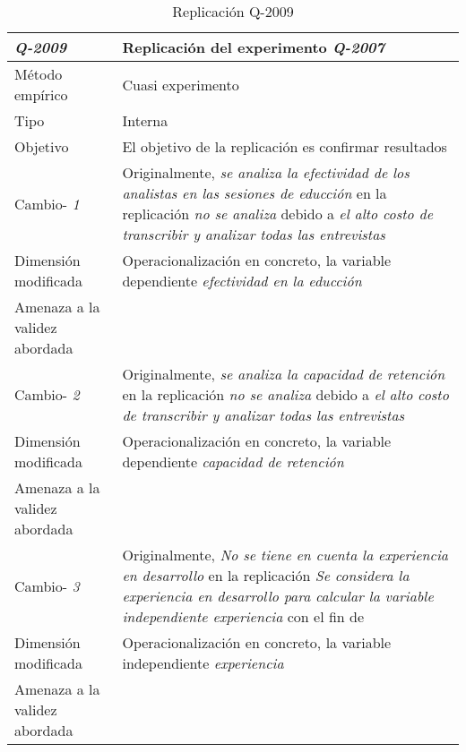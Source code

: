 
\begin{table}
\caption{Replicación Q-2009}
\begin{tabular}{| p{3.3cm} | p{9cm} |}
\hline

\textbf {\textit{Q-2009}} & Replicación del experimento \textit{Q-2007 }    \\  \hline

Método empírico &  Cuasi experimento   \\  \hline
Tipo &  Interna   \\  \hline
Objetivo  &   El objetivo de la replicación es confirmar resultados   \\  \hline \hline

Cambio- \textit{1}   & \parbox[t]{9cm} {Originalmente,  \textit{se analiza la efectividad de los analistas en las sesiones de educción} } \parbox[t]{9cm}{en la replicación \textit{no se analiza} }  debido a  \textit{el alto costo de transcribir y analizar todas las entrevistas } \\  \hline
Dimensión modificada & 
 Operacionalización  en concreto, la variable  dependiente \textit { efectividad en la educción }  \\  \hline 
Amenaza a la validez abordada  &     \\  \hline
 \hline
Cambio- \textit{2}   & \parbox[t]{9cm} {Originalmente,  \textit{se analiza la capacidad de retención
} } \parbox[t]{9cm}{en la replicación \textit{no se analiza} }  debido a   \textit{el alto costo de transcribir y analizar todas las entrevistas} \\  \hline
Dimensión modificada & 
Operacionalización  en concreto, la variable  dependiente \textit { capacidad de retención }  \\  \hline 
Amenaza a la validez abordada  &    \\  \hline \hline

Cambio- \textit{3}   & \parbox[t]{9cm} {Originalmente,  \textit{ No se tiene en cuenta la experiencia en desarrollo } } \parbox[t]{9cm}{en la replicación \textit{Se considera la experiencia en desarrollo para calcular la variable independiente experiencia} }  con el fin de  \textit{ } \\  \hline
Dimensión modificada & 
  Operacionalización  en concreto, la variable  independiente \textit {experiencia}  \\  \hline 
Amenaza a la validez abordada  &    \\  \hline \hline 


\end{tabular}
\end{table}
